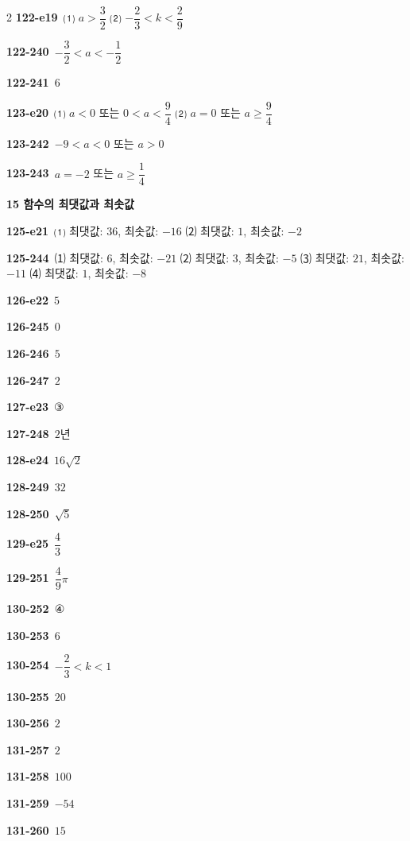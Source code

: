 \documentclass[10pt,a4paper]{article}
\begin{document}
\begin{multicols}{2}
\noindent\textbf{122-e19}\ ⑴ $a>\dfrac{3}{2}$ ⑵ $-\dfrac{2}{3}<k<\dfrac{2}{9}$\par
\noindent\textbf{122-240}\ $-\dfrac{3}{2}<a<-\dfrac{1}{2}$\par
\noindent\textbf{122-241}\ $6$\par
\noindent\textbf{123-e20}\ ⑴ $a<0$ 또는 $0<a<\dfrac{9}{4}$ ⑵ $a=0$ 또는 $a\ge\dfrac{9}{4}$\par
\noindent\textbf{123-242}\ $-9<a<0$ 또는 $a>0$\par
\noindent\textbf{123-243}\ $a=-2$ 또는 $a\ge\dfrac{1}{4}$\par
\noindent\textbf{15 함수의 최댓값과 최솟값}\par\smallskip
\noindent\textbf{125-e21}\ ⑴ 최댓값: $36$, 최솟값: $-16$ ⑵ 최댓값: $1$, 최솟값: $-2$\par
\noindent\textbf{125-244}\ ⑴ 최댓값: $6$, 최솟값: $-21$ ⑵ 최댓값: $3$, 최솟값: $-5$ ⑶ 최댓값: $21$, 최솟값: $-11$ ⑷ 최댓값: $1$, 최솟값: $-8$\par
\noindent\textbf{126-e22}\ $5$\par
\noindent\textbf{126-245}\ $0$\par
\noindent\textbf{126-246}\ $5$\par
\noindent\textbf{126-247}\ $2$\par
\noindent\textbf{127-e23}\ ③\par
\noindent\textbf{127-248}\ $2$년\par
\noindent\textbf{128-e24}\ $16\sqrt{2}$\par
\noindent\textbf{128-249}\ $32$\par
\noindent\textbf{128-250}\ $\sqrt{5}$\par
\noindent\textbf{129-e25}\ $\dfrac{4}{3}$\par
\noindent\textbf{129-251}\ $\dfrac{4}{9}\pi$\par
\noindent\textbf{130-252}\ ④\par
\noindent\textbf{130-253}\ $6$\par
\noindent\textbf{130-254}\ $-\dfrac{2}{3}<k<1$\par
\noindent\textbf{130-255}\ $20$\par
\noindent\textbf{130-256}\ $2$\par
\noindent\textbf{131-257}\ $2$\par
\noindent\textbf{131-258}\ $100$\par
\noindent\textbf{131-259}\ $-54$\par
\noindent\textbf{131-260}\ $15$\par

\end{multicols}
\end{document}
